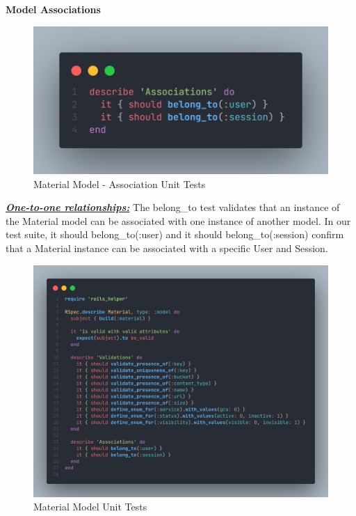 \begin{justify}
\vspace{0.25cm}
\newendline
\textbf{Model Associations}

    \begin{figure}[H]
        \centerline{\includegraphics[width=140mm,scale=1]{figures/implementation_and_testing/testing/AUT/material/associations.png}}
        \caption{Material Model - Association Unit Tests}
        \label{Material Model - Association Unit Tests}
    \end{figure}


\vspace{-0.5cm}
\noindent\textbf{\textit{\underline{One-to-one relationships:}}} The belong\_to test validates that an instance of the Material model can be associated with one instance of another model. In our test suite, it { should belong\_to(:user) } and it { should belong\_to(:session) } confirm that a Material instance can be associated with a specific User and Session.


    \begin{figure}[H]
        \centerline{\includegraphics[width=140mm,scale=1]{figures/implementation_and_testing/testing/AUT/material/all.png}}
        \caption{Material Model Unit Tests}
        \label{Material Model Unit Tests}
    \end{figure}




\end{justify}
